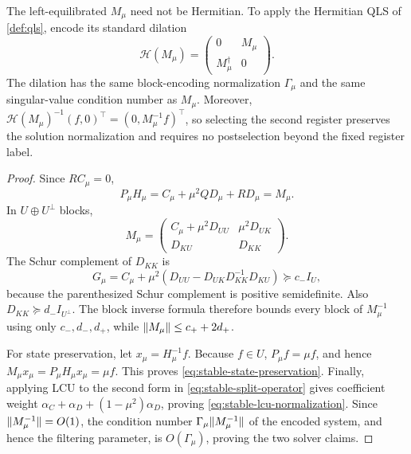 The left-equilibrated $M_\mu$ need not be Hermitian.  To apply the
Hermitian QLS of \cref{def:qls}, encode its standard dilation
\begin{equation}
 \mathcal H(M_\mu)=
 \begin{pmatrix}0&M_\mu\\M_\mu^\dagger&0\end{pmatrix}.
 \label{eq:stable-hermitian-dilation}
\end{equation}
The dilation has the same block-encoding normalization $\Gamma_\mu$ and
the same singular-value condition number as $M_\mu$.  Moreover,
$\mathcal H(M_\mu)^{-1}(f,0)^\top=(0,M_\mu^{-1}f)^\top$, so selecting the
second register preserves the solution normalization and requires no
postselection beyond the fixed register label.

\begin{proof}
Since $RC_\mu=0$,
\[
 P_\mu H_\mu=C_\mu+\mu^2QD_\mu+RD_\mu=M_\mu.
\]
In $U\oplus U^\perp$ blocks,
\[
 M_\mu=
 \begin{pmatrix}
 C_\mu+\mu^2D_{UU}&\mu^2D_{UK}\\
 D_{KU}&D_{KK}
 \end{pmatrix}.
\]
The Schur complement of $D_{KK}$ is
\[
 G_\mu=C_\mu+\mu^2
 (D_{UU}-D_{UK}D_{KK}^{-1}D_{KU})\succeq c_-I_U,
\]
because the parenthesized Schur complement is positive semidefinite.
Also $D_{KK}\succeq d_-I_{U^\perp}$.  The block inverse formula therefore
bounds every block of $M_\mu^{-1}$ using only $c_-,d_-,d_+$, while
$\lVert M_\mu\rVert\leq c_++2d_+$.

For state preservation, let $x_\mu=H_\mu^{-1}f$.  Because $f\in U$,
$P_\mu f=\mu f$, and hence
$M_\mu x_\mu=P_\mu H_\mu x_\mu=\mu f$.  This proves
\eqref{eq:stable-state-preservation}.  Finally, applying LCU to the second
form in \eqref{eq:stable-split-operator} gives coefficient weight
$\alpha_C+\alpha_D+(1-\mu^2)\alpha_D$, proving
\eqref{eq:stable-lcu-normalization}.  Since $\lVert M_\mu^{-1}\rVert=O(1)$, the
condition number $\Gamma_\mu\lVert M_\mu^{-1}\rVert$ of the encoded system, and
hence the filtering parameter, is $O(\Gamma_\mu)$, proving the two solver
claims.
\end{proof}

